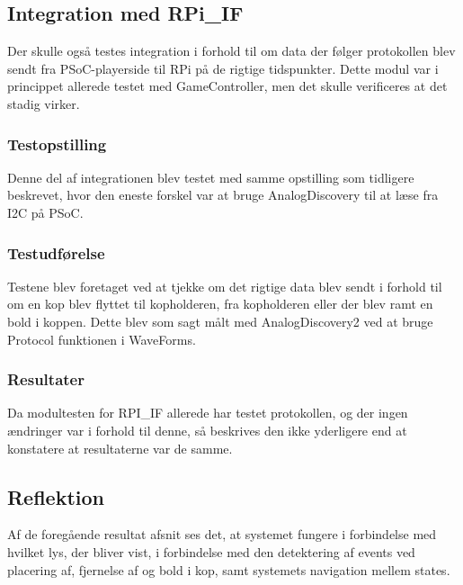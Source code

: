 \documentclass[Integrationstest/Integrationstest_main.tex]{subfiles}
\begin{document}
\subsection{Integration med RPi\_IF}
Der skulle også testes integration i forhold til om  data der følger protokollen blev sendt fra PSoC-playerside til RPi på de rigtige tidspunkter. Dette modul var i princippet allerede testet med GameController, men det skulle verificeres at det stadig virker.

\subsubsection{Testopstilling}
Denne del af integrationen blev testet med samme opstilling som tidligere beskrevet, hvor den eneste forskel var at bruge AnalogDiscovery til at læse fra I2C på PSoC.

\subsubsection{Testudførelse}
Testene blev foretaget ved at tjekke om det rigtige data blev sendt i forhold til om en kop blev flyttet til kopholderen, fra kopholderen eller der blev ramt en bold i koppen. Dette blev som sagt målt med AnalogDiscovery2 ved at bruge Protocol funktionen i WaveForms.

\subsubsection{Resultater}
Da modultesten for RPI\_IF allerede har testet protokollen, og der ingen ændringer var i forhold til denne, så beskrives den ikke yderligere end at konstatere at resultaterne var de samme.


\subsection{Reflektion}
Af de foregående resultat afsnit ses det, at systemet fungere i forbindelse med hvilket lys, der bliver vist, i forbindelse med den detektering af events  ved placering af, fjernelse af og bold i kop, samt systemets navigation mellem states.
\end{document}
